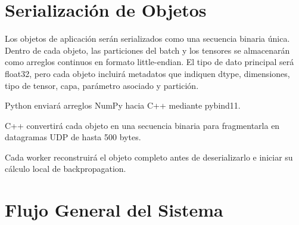 \documentclass[12pt]{article}
\begin{document}
\section{Serialización de Objetos}

Los objetos de aplicación serán serializados como una secuencia binaria única. Dentro de cada objeto, las particiones del batch y los tensores se almacenarán como arreglos continuos en formato little-endian. El tipo de dato principal será float32, pero cada objeto incluirá metadatos que indiquen dtype, dimensiones, tipo de tensor, capa, parámetro asociado y partición.

Python enviará arreglos NumPy hacia C++ mediante pybind11.

C++ convertirá cada objeto en una secuencia binaria para fragmentarla en datagramas UDP de hasta 500 bytes.

Cada worker reconstruirá el objeto completo antes de deserializarlo e iniciar su cálculo local de backpropagation.

\section{Flujo General del Sistema}
\end{document}
